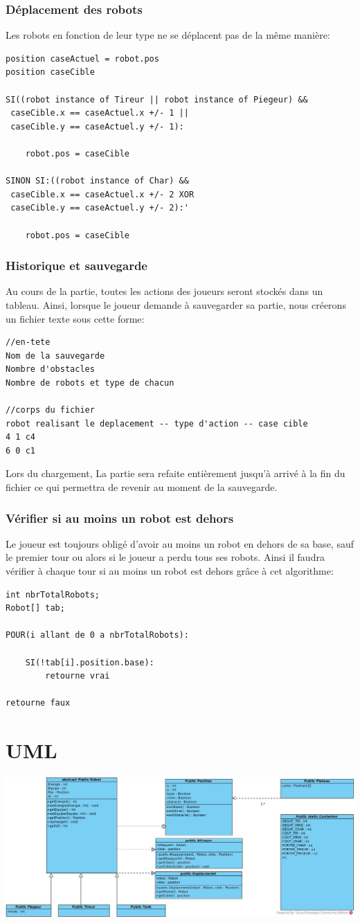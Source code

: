 \documentclass[12pt]{article}
\begin{document}
\section{Déplacement des robots}
Les robots en fonction de leur type ne se déplacent pas de la même manière:
\begin{lstlisting}
position caseActuel = robot.pos
position caseCible

SI((robot instance of Tireur || robot instance of Piegeur) &&
 caseCible.x == caseActuel.x +/- 1 ||
 caseCible.y == caseActuel.y +/- 1):
	 
	robot.pos = caseCible

SINON SI:((robot instance of Char) && 
 caseCible.x == caseActuel.x +/- 2 XOR
 caseCible.y == caseActuel.y +/- 2):'
 
	robot.pos = caseCible
\end{lstlisting}

\section{Historique et sauvegarde}
Au cours de la partie, toutes les actions des joueurs seront stockés dans un tableau.
Ainsi, lorsque le joueur demande à sauvegarder sa partie, nous créerons un fichier texte sous cette forme:
\begin{lstlisting}
//en-tete
Nom de la sauvegarde
Nombre d'obstacles
Nombre de robots et type de chacun

//corps du fichier
robot realisant le deplacement -- type d'action -- case cible
4 1 c4
6 0 c1
\end{lstlisting}
Lors du chargement, La partie sera refaite entièrement jusqu'à arrivé à la fin du fichier ce qui permettra de revenir au moment de la sauvegarde.

\newpage
\section{Vérifier si au moins un robot est dehors}
Le joueur est toujours obligé d'avoir au moins un robot en dehors de sa base, sauf le premier tour ou alors si le joueur a perdu tous ses robots. Ainsi il faudra vérifier à chaque tour si au moins un robot est dehors grâce à cet algorithme:

\begin{lstlisting}
int nbrTotalRobots;
Robot[] tab;

POUR(i allant de 0 a nbrTotalRobots):

	SI(!tab[i].position.base):
		retourne vrai

retourne faux
\end{lstlisting}


\part*{UML}

\includegraphics[scale=0.5, angle = -90]{img/uml.jpg}
\end{document}
